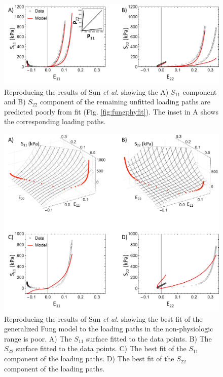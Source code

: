 \begin{figure}[hptb]
\centering
\includegraphics[width=\textwidth]{Images/chapter5/fungphypred}
\caption{Reproducing the results of Sun \textit{et al.} \cite{sun_biaxial_2003} showing the A) $S_{11}$ component and B) $S_{22}$ component of the remaining unfitted loading paths are predicted poorly from fit (Fig. \ref{fig:fungphyfit}). The inset in A shows the corresponding loading paths.}
\label{fig:fungphypred}
\end{figure} 


\begin{figure}[hptb]
\centering
\includegraphics[width=\textwidth]{Images/chapter5/fungoutfit}
\caption{Reproducing the results of Sun \textit{et al.} \cite{sun_biaxial_2003} showing the best fit of the generalized Fung model to the loading paths in the non-physiologic range is poor. A) The $S_{11}$ surface fitted to the data points. B) The $S_{22}$ surface fitted to the data points. C) The best fit of the $S_{11}$ component of the loading paths. D) The best fit of the $S_{22}$ component of the loading paths.}
\label{fig:fungoutfit}
\end{figure} 

